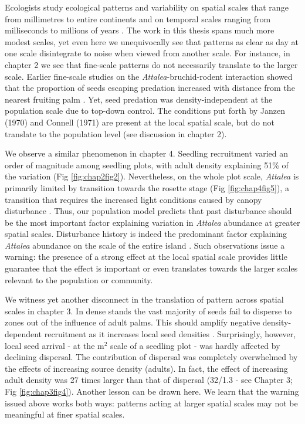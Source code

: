 \documentclass[b5paper,justified]{tufte-book} %
\begin{document}
\begin{fullwidth}
Ecologists study ecological patterns and variability on spatial scales that range from millimetres \citep{Seymour2000} to entire continents \citep{Chisholm2014} and on temporal scales ranging from milliseconds 
\citep{Bostwick2003} to millions of years \citep{Allmon1993}. The work in this thesis spans much more modest scales, yet even here we unequivocally see that patterns as clear as day at one scale disintegrate to noise when viewed from another scale. For instance, in chapter 2 we see that fine-scale patterns do not necessarily translate to the larger scale. Earlier fine-scale studies on the \textit{Attalea}-bruchid-rodent interaction showed that the proportion of seeds escaping predation increased with distance from the nearest fruiting palm \citep{Wright1983, Wright2001a}. Yet, seed predation was density-independent at the population scale due to top-down control. The conditions put forth by Janzen (1970) and Connell (1971) are present at the local spatial scale, but do not translate to the population level (see discussion in chapter 2). 

We observe a similar phenomenon in chapter 4. Seedling recruitment varied an order of magnitude among seedling plots, with adult density explaining 51\% of the variation (Fig \ref{fig:chap2fig2}). Nevertheless, on the whole plot scale, \textit{Attalea} is primarily limited by transition towards the rosette stage (Fig \ref{fig:chap4fig5}), a transition that requires the increased light conditions caused by canopy disturbance \citep{Araus1994}. Thus, our population model predicts that past disturbance should be the most important factor explaining variation in \textit{Attalea} abundance at greater spatial scales. Disturbance history is indeed the predominant factor explaining \textit{Attalea} abundance on the scale of the entire island \citep{Garzon-Lopez2014}. Such observations issue a warning: the presence of a strong effect at the local spatial scale provides little guarantee that the effect is important or even translates towards the larger scales relevant to the population or community. 

We witness yet another disconnect in the translation of pattern across spatial scales in chapter 3. In dense stands the vast majority of seeds fail to disperse to zones out of the influence of adult palms. This should amplify negative density-dependent recruitment as it increases local seed densities \citep{Janzen1970,  Wright2002}. Surprisingly, however, local seed arrival - at the m$^2$ scale of a seedling plot - was hardly affected by declining dispersal. The contribution of dispersal was completely overwhelmed by the effects of increasing source density (adults). In fact, the effect of increasing adult density was 27 times larger than that of dispersal (32/1.3 - see Chapter 3; Fig \ref{fig:chap3fig4}). Another lesson can be drawn here. We learn that the warning issued above works both ways: patterns acting at larger spatial scales may not be meaningful at finer spatial scales.


\end{fullwidth}
\end{document}
